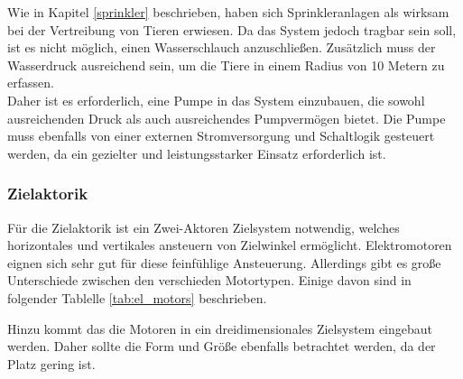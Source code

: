 Wie in Kapitel \ref{sprinkler} beschrieben, haben sich Sprinkleranlagen als wirksam bei der Vertreibung von Tieren erwiesen. Da das System jedoch tragbar sein soll, ist es nicht möglich, einen Wasserschlauch anzuschließen. Zusätzlich muss der Wasserdruck ausreichend sein, um die Tiere in einem Radius von 10 Metern zu erfassen.
\\
Daher ist es erforderlich, eine Pumpe in das System einzubauen, die sowohl ausreichenden Druck als auch ausreichendes Pumpvermögen bietet. Die Pumpe muss ebenfalls von einer externen Stromversorgung und Schaltlogik gesteuert werden, da ein gezielter und leistungsstarker Einsatz erforderlich ist.

\subsubsection{Zielaktorik}

Für die Zielaktorik ist ein Zwei-Aktoren Zielsystem notwendig, welches horizontales und vertikales ansteuern von Zielwinkel ermöglicht. Elektromotoren eignen sich sehr gut für diese feinfühlige Ansteuerung. Allerdings gibt es große Unterschiede zwischen den verschieden Motortypen. Einige davon sind in folgender Tablelle \ref{tab:el_motors} beschrieben.

Hinzu kommt das die Motoren in ein dreidimensionales Zielsystem eingebaut werden. Daher sollte die Form und Größe ebenfalls betrachtet werden, da der Platz gering ist.


